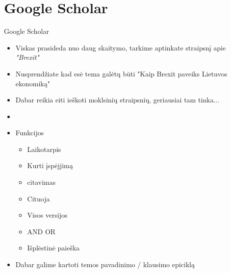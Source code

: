 \documentclass[11pt,xcolor=table]{beamer}
\begin{document}
\section{Google Scholar}
\begin{frame}{Google Scholar}
\begin{itemize}
\item Viskas prasideda nuo daug skaitymo, tarkime aptinkate  \href{https://www.economist.com/graphic-detail/2019/02/13/a-no-deal-brexit-would-affect-more-than-just-british-trade-with-the-eu}{\color{blue}{"The Economist"}} straipsnį apie \textit{"Brexit"}
\item Nusprendžiate kad esė tema galėtų būti "Kaip Brexit paveiks Lietuvos ekonomiką"
\item Dabar reikia eiti ieškoti moklsinių straipsnių, geriausiai tam tinka...
\item \href{https://scholar.google.lt/}{\color{blue}{https://scholar.google.lt/}}
\item Funkcijos
\begin{itemize}
\item Laikotarpis
\item Kurti įspėjjimą
\item citavimas
\item Cituoja
\item Visos versijos
\item AND OR 
\item Išplėstinė paieška
\end{itemize}
\item Dabar galime kartoti temos pavadinimo / klausimo epiciklą

\end{itemize}
\end{frame}
\end{document}

